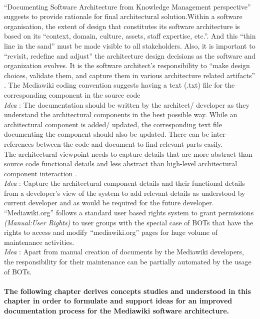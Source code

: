 \\\indent \enquote{Documenting Software Architecture from Knowledge Management perspective} \cite{bab2009} suggests to provide rationale for final architectural solution.Within a software organisation, the extent of design that constitutes its software architecture is based on its \enquote{context, domain, culture, assets, staff expertise, etc.}. And this \enquote{thin line in the sand} must be made visible to all stakeholders. Also, it is important to \enquote{revisit, redefine and adjust} the architecture design decisions as the software and organization evolves. It is the software architect's responsibility to \enquote{make design choices, validate them, and capture them in various architecture related artifacts} \cite{Kruchten2008}. The Mediawiki coding convention suggests having a text (.txt) file for the corresponding component in the source code \cite{Manual_coding}
\\\indent\emph{Idea} : The documentation should be written by the architect/ developer as they understand the architectural components in the best possible way. While an architectural component is added/ updated, the corresponding text file documenting the component should also be updated. There can be inter-references between the code and document to find relevant parts easily.
\newline
\\\indent The architectural viewpoint needs to capture details that are more abstract than source code functional details and less abstract than high-level architectural component interaction \cite{bab2009}.
\\\indent\emph{Idea} : Capture the architectural component details and their functional details from a developer's view of the system to add relevant details as understood by current developer and as would be required for the future developer.
\newline
\\\indent \enquote{Mediawiki.org} follows a standard user based rights system to grant permissions \emph{(Manual:User Rights)} to user groups with the special case of BOTs that have the rights to access and modify \enquote{mediawiki.org} pages for huge volume of maintenance activities.
\\\indent\emph{Idea} : Apart from manual creation of documents by the Mediawiki developers, the responsibility for their maintenance can be partially automated by the usage of BOTs.



\paragraph{The following chapter derives concepts studies and understood in this chapter in order to formulate and support ideas for an improved documentation process for the Mediawiki software architecture. }


